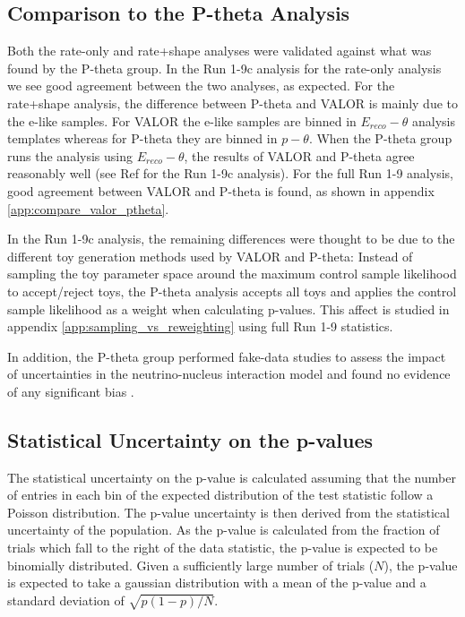 {\color{red}
	\subsection{Comparison to the P-theta Analysis}
} %

Both the rate-only and rate+shape analyses were validated against what was found by the P-theta group. {\color{red} In the Run 1-9c analysis for} the rate-only analysis we see good agreement between the two analyses, as expected. For the rate+shape analysis, the difference between P-theta and VALOR is mainly due to the e-like samples. For VALOR the e-like samples are binned in $E_{reco}-\theta$ analysis templates whereas for P-theta they are binned in $p-\theta$. When the P-theta group runs the analysis using $E_{reco}-\theta$, the results of VALOR and P-theta agree reasonably well {\color{red} (see Ref \cite{nuebarapp_valor_plenary_run1-9c} for the Run 1-9c analysis). For the full Run 1-9 analysis, good agreement between VALOR and P-theta is found, as shown in appendix \ref{app:compare_valor_ptheta}.}

{\color{red}
In the Run 1-9c analysis, the remaining differences were thought to be due to the different toy generation methods used by VALOR and P-theta: Instead of sampling the toy parameter space around the maximum control sample likelihood to accept/reject toys, the P-theta analysis accepts all toys and applies the control sample likelihood as a weight when calculating p-values. This affect is studied in appendix \ref{app:sampling_vs_reweighting} using full Run 1-9 statistics.
} %

In addition, the P-theta group performed fake-data studies to assess the impact of uncertainties in the neutrino-nucleus interaction model and found no evidence of any significant bias \cite{PthetaR19cNuebarAppearance}.\\


\subsection{Statistical Uncertainty on the p-values}
The statistical uncertainty on the p-value is calculated assuming that the number of entries in each bin of the expected distribution of the test statistic follow a Poisson distribution. The p-value uncertainty is then derived from the statistical uncertainty of the population. As the p-value is calculated from the fraction of trials which fall to the right of the data statistic, the p-value is expected to be binomially distributed. Given a sufficiently large number of trials ($N$), the p-value is expected to take a gaussian distribution with a mean of the p-value and a standard deviation of $\sqrt{p(1-p)/N}$.


